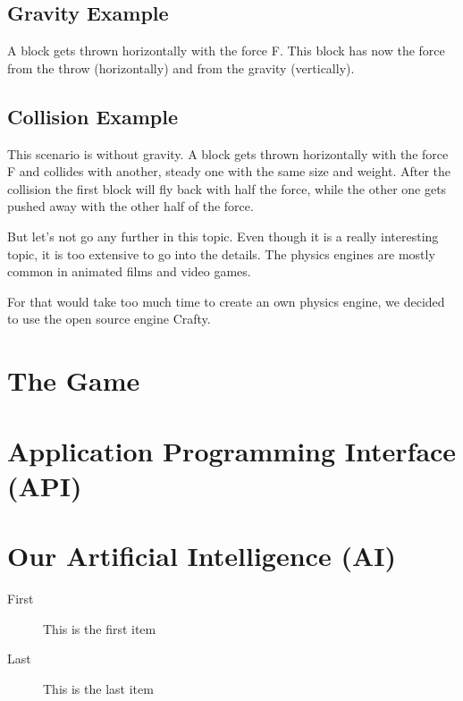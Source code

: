 \documentclass[DIV=calc, paper=a4, fontsize=11pt, twocolumn]{scrartcl}	 %
\begin{document}
\subsection*{Gravity Example}
A block gets thrown horizontally with the force F. This block has now the force from the throw (horizontally) and from the gravity (vertically).
\subsection*{Collision Example}
This scenario is without gravity. A block gets thrown horizontally with the force F and collides with another, steady one with the same size and weight. After the collision the first block will fly back with half the force, while the other one gets pushed away with the other half of the force.

But let's not go any further in this topic. Even though it is a really interesting topic, it is too extensive to go into the details.
The physics engines are mostly common in animated films and video games. 

For that would take too much time to create an own physics engine, we decided to use the open source engine Crafty. 

\section*{The Game}

\section*{Application Programming Interface (API)}

\section*{Our Artificial Intelligence (AI)}


\begin{description}
\item[First] This is the first item
\item[Last] This is the last item
\end{description}


\end{document}
